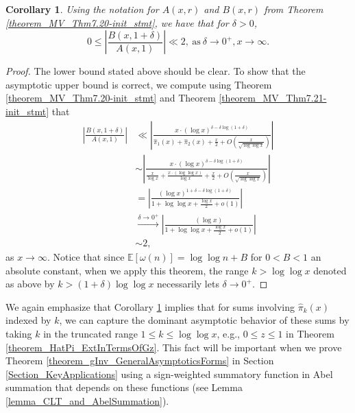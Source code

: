 \documentclass[11pt,reqno,a4letter]{article}
\numberwithin{figure}{section}
\numberwithin{table}{section}
\theoremstyle{plain}
\newtheorem{cor}[theorem]{Corollary}
\numberwithin{theorem}{section}
\theoremstyle{definition}
\begin{document}
\begin{cor} 
\label{theorem_MV_Thm7.20} 
Using the notation for $A(x, r)$ and $B(x, r)$ from 
Theorem \ref{theorem_MV_Thm7.20-init_stmt}, 
we have that for $\delta > 0$, 
\[
0 \leq \left\lvert \frac{B(x, 1+\delta)}{A(x, 1)} \right\rvert \ll 2, 
     \mathrm{\ as\ } \delta \rightarrow 0^{+}, x \rightarrow \infty. 
\]
\end{cor} 
\begin{proof} 
The lower bound stated above should be clear. To show that the asymptotic 
upper bound is correct, we compute using Theorem \ref{theorem_MV_Thm7.20-init_stmt} and 
Theorem \ref{theorem_MV_Thm7.21-init_stmt} that 
\begin{align*} 
\left\lvert \frac{B(x, 1+\delta)}{A(x, 1)} \right\rvert & \ll 
     \left\lvert \frac{x \cdot (\log x)^{\delta - \delta\log(1+\delta)}}{ 
     \widehat{\pi}_1(x) + \widehat{\pi}_2(x) + \frac{x}{2} + 
     O\left(\frac{x}{\sqrt{\log\log x}}\right)} \right\rvert \\ 
     & \sim 
     \left\lvert \frac{x \cdot (\log x)^{\delta - \delta\log(1+\delta)}}{ 
     \frac{x}{\log x} + \frac{x \cdot (\log\log x)}{\log x} + \frac{x}{2} + 
     O\left(\frac{x}{\sqrt{\log\log x}}\right)} \right\rvert \\ 
     & = 
     \left\lvert \frac{(\log x)^{1 + \delta - \delta\log(1+\delta)}}{ 
     1 + \log\log x + \frac{\log x}{2} + o(1)}\right\rvert \\ 
     & \xrightarrow{\delta \rightarrow 0^{+}} 
     \left\lvert \frac{(\log x)}{ 
     1 + \log\log x + \frac{\log x}{2} + o(1)} \right\rvert \\ 
     & \sim 2, 
\end{align*} 
as $x \rightarrow \infty$. Notice that since $\mathbb{E}[\omega(n)] = \log\log n + B$ for $0 < B < 1$ an 
absolute constant, when we apply this theorem, the range $k > \log\log x$ denoted as above by 
$k > (1 + \delta) \log\log x$ necessarily lets $\delta \rightarrow 0^{+}$. 
\end{proof} 

We again emphasize that 
Corollary \ref{theorem_MV_Thm7.20} implies that for sums involving $\widehat{\pi}_k(x)$ indexed by $k$, 
we can capture the dominant asymptotic behavior of these sums by taking $k$ in the truncated range 
$1 \leq k \leq \log\log x$, e.g., $0 \leq z \leq 1$ in Theorem \ref{theorem_HatPi_ExtInTermsOfGz}. 
This fact will be important when we prove 
Theorem \ref{theorem_gInv_GeneralAsymptoticsForms} in 
Section \ref{Section_KeyApplications} using a sign-weighted 
summatory function in Abel summation that depends on these functions 
(see Lemma \ref{lemma_CLT_and_AbelSummation}). 
\end{document}
